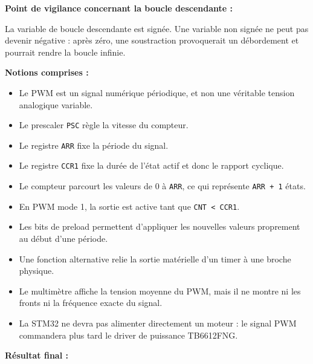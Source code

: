 \documentclass[11pt,a4paper]{article}
\begin{document}
\begin{sessionbox}
		\vspace{0.3cm}
		
		\textbf{Point de vigilance concernant la boucle descendante :}
		
		La variable de boucle descendante est signée. Une variable non signée ne peut pas devenir négative : après zéro, une soustraction provoquerait un débordement et pourrait rendre la boucle infinie.
		
		\vspace{0.3cm}
		
		\textbf{Notions comprises :}
		
		\begin{itemize}
			\item Le PWM est un signal numérique périodique, et non une véritable tension analogique variable.
			\item Le prescaler \texttt{PSC} règle la vitesse du compteur.
			\item Le registre \texttt{ARR} fixe la période du signal.
			\item Le registre \texttt{CCR1} fixe la durée de l'état actif et donc le rapport cyclique.
			\item Le compteur parcourt les valeurs de 0 à \texttt{ARR}, ce qui représente \texttt{ARR + 1} états.
			\item En PWM mode 1, la sortie est active tant que \texttt{CNT < CCR1}.
			\item Les bits de preload permettent d'appliquer les nouvelles valeurs proprement au début d'une période.
			\item Une fonction alternative relie la sortie matérielle d'un timer à une broche physique.
			\item Le multimètre affiche la tension moyenne du PWM, mais il ne montre ni les fronts ni la fréquence exacte du signal.
			\item La STM32 ne devra pas alimenter directement un moteur : le signal PWM commandera plus tard le driver de puissance TB6612FNG.
		\end{itemize}
		
		\vspace{0.3cm}
		
		\textbf{Résultat final :}
		
		\begin{center}
		\end{center}
		

\end{sessionbox}
\end{document}
